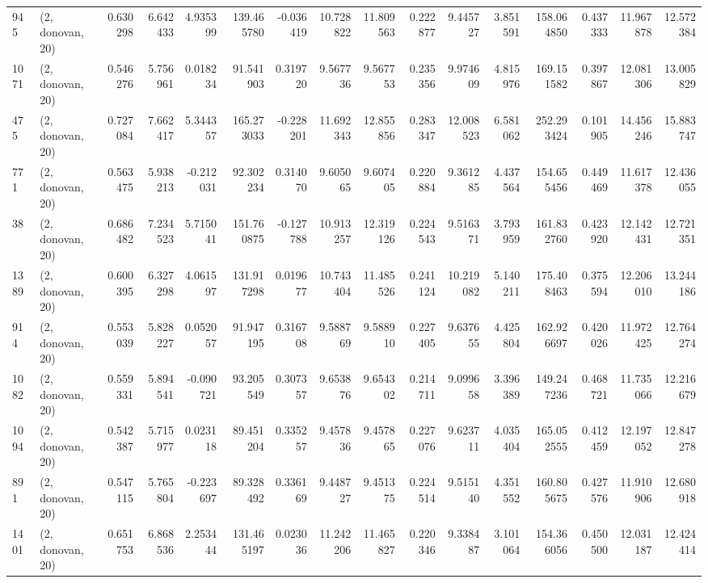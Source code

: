 \begin{tabular}{llrrrrrrrrrrrrrr}
945  &  (2, donovan, 20) &   0.630298 &   6.642433 &   4.935399 &    139.465780 &   -0.036419 &   10.728822 &   11.809563 &  0.222877 &   9.445727 &   3.851591 &   158.064850 &   0.437333 &  11.967878 &  12.572384 \\
1071 &  (2, donovan, 20) &   0.546276 &   5.756961 &   0.018234 &     91.541903 &    0.319720 &    9.567736 &    9.567753 &  0.235356 &   9.974609 &   4.815976 &   169.151582 &   0.397867 &  12.081306 &  13.005829 \\
475  &  (2, donovan, 20) &   0.727084 &   7.662417 &   5.344357 &    165.273033 &   -0.228201 &   11.692343 &   12.855856 &  0.283347 &  12.008523 &   6.581062 &   252.293424 &   0.101905 &  14.456246 &  15.883747 \\
771  &  (2, donovan, 20) &   0.563475 &   5.938213 &  -0.212031 &     92.302234 &    0.314070 &    9.605065 &    9.607405 &  0.220884 &   9.361285 &   4.437564 &   154.655456 &   0.449469 &  11.617378 &  12.436055 \\
38   &  (2, donovan, 20) &   0.686482 &   7.234523 &   5.715041 &    151.760875 &   -0.127788 &   10.913257 &   12.319126 &  0.224543 &   9.516371 &   3.793959 &   161.832760 &   0.423920 &  12.142431 &  12.721351 \\
1389 &  (2, donovan, 20) &   0.600395 &   6.327298 &   4.061597 &    131.917298 &    0.019677 &   10.743404 &   11.485526 &  0.241124 &  10.219082 &   5.140211 &   175.408463 &   0.375594 &  12.206010 &  13.244186 \\
914  &  (2, donovan, 20) &   0.553039 &   5.828227 &   0.052057 &     91.947195 &    0.316708 &    9.588769 &    9.588910 &  0.227405 &   9.637655 &   4.425804 &   162.926697 &   0.420026 &  11.972425 &  12.764274 \\
1082 &  (2, donovan, 20) &   0.559331 &   5.894541 &  -0.090721 &     93.205549 &    0.307357 &    9.653876 &    9.654302 &  0.214711 &   9.099658 &   3.396389 &   149.247236 &   0.468721 &  11.735066 &  12.216679 \\
1094 &  (2, donovan, 20) &   0.542387 &   5.715977 &   0.023118 &     89.451204 &    0.335257 &    9.457836 &    9.457865 &  0.227076 &   9.623711 &   4.035404 &   165.052555 &   0.412459 &  12.197052 &  12.847278 \\
891  &  (2, donovan, 20) &   0.547115 &   5.765804 &  -0.223697 &     89.328492 &    0.336169 &    9.448727 &    9.451375 &  0.224514 &   9.515140 &   4.351552 &   160.805675 &   0.427576 &  11.910906 &  12.680918 \\
1401 &  (2, donovan, 20) &   0.651753 &   6.868536 &   2.253444 &    131.465197 &    0.023036 &   11.242206 &   11.465827 &  0.220346 &   9.338487 &   3.101064 &   154.366056 &   0.450500 &  12.031187 &  12.424414 \\

\end{tabular}

